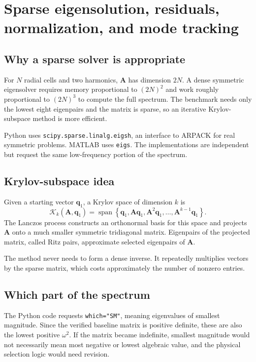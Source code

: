 \section{Sparse eigensolution, residuals, normalization, and mode tracking}
\label{sec:eigensolution}

\subsection{Why a sparse solver is appropriate}
For $N$ radial cells and two harmonics, $\mathbf A$ has dimension $2N$. A dense symmetric eigensolver requires memory proportional to $(2N)^2$ and work roughly proportional to $(2N)^3$ to compute the full spectrum. The benchmark needs only the lowest eight eigenpairs and the matrix is sparse, so an iterative Krylov-subspace method is more efficient.

Python uses \texttt{scipy.sparse.linalg.eigsh}, an interface to ARPACK for real symmetric problems. MATLAB uses \texttt{eigs}. The implementations are independent but request the same low-frequency portion of the spectrum.

\subsection{Krylov-subspace idea}
Given a starting vector $\mathbf q_1$, a Krylov space of dimension $k$ is
\begin{equation}
\mathcal K_k(\mathbf A,\mathbf q_1)
=\operatorname{span}\left\{\mathbf q_1,\mathbf A\mathbf q_1,\mathbf A^2\mathbf q_1,\ldots,\mathbf A^{k-1}\mathbf q_1\right\}.
\end{equation}
The Lanczos process constructs an orthonormal basis for this space and projects $\mathbf A$ onto a much smaller symmetric tridiagonal matrix. Eigenpairs of the projected matrix, called Ritz pairs, approximate selected eigenpairs of $\mathbf A$.

The method never needs to form a dense inverse. It repeatedly multiplies vectors by the sparse matrix, which costs approximately the number of nonzero entries.

\subsection{Which part of the spectrum}
The Python code requests \texttt{which="SM"}, meaning eigenvalues of smallest magnitude. Since the verified baseline matrix is positive definite, these are also the lowest positive $\omega^2$. If the matrix became indefinite, smallest magnitude would not necessarily mean most negative or lowest algebraic value, and the physical selection logic would need revision.

